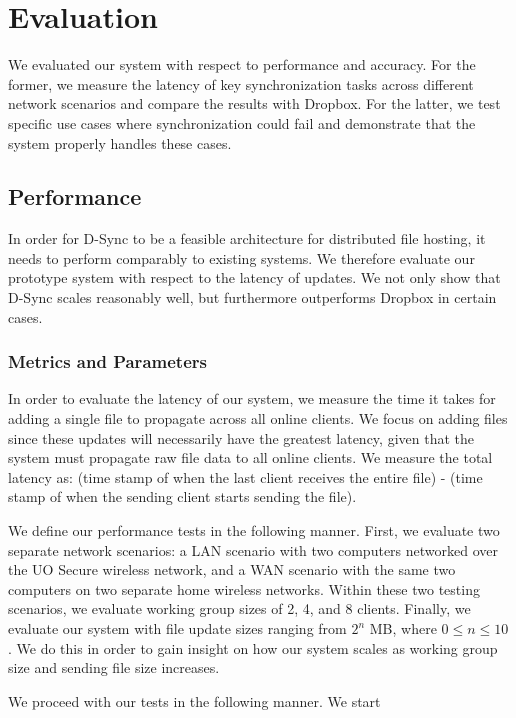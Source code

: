 \section{Evaluation}
\label{evaluation}
We evaluated our system with respect to performance and accuracy.
For the former, we measure the latency of key synchronization tasks
across different network scenarios and compare the results
with Dropbox. For the latter, we test specific use cases
where synchronization could fail and demonstrate that the system
properly handles these cases.

\subsection{Performance}
\label{evaluation.performance}
In order for D-Sync to be a feasible architecture
for distributed file hosting, it needs to perform comparably
to existing systems.
We therefore evaluate our prototype system with respect
to the latency of updates.
We not only show that D-Sync scales reasonably well,
but furthermore outperforms Dropbox in certain cases.

\subsubsection{Metrics and Parameters}
In order to evaluate the latency of our system,
we measure the time it takes for adding a single file to 
propagate across all online clients.
We focus on adding files since these updates will necessarily
have the greatest latency, given that the system
must propagate raw file data to all online clients.
We measure the total latency as: (time stamp of when the last client receives
the entire file) - (time stamp of when the sending client starts sending the file).

We define our performance tests in the following manner.
First, we evaluate two separate network scenarios: a LAN scenario with
two computers networked over the UO Secure wireless network,
and a WAN scenario with the same two computers on two separate home
wireless networks. Within these two testing scenarios,
we evaluate working group sizes of 2, 4, and 8 clients.
Finally, we evaluate our system with file update sizes ranging
from $2^n$ MB, where $0 \leq n \leq 10$.
We do this in order to gain insight on how our system scales
as working group size and sending file size increases.

We proceed with our tests in the following manner.
We start 

